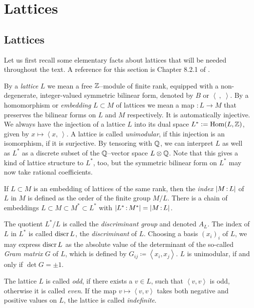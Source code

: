 \chapter{Lattices}
\section{Lattices}\label{latticeSubsection}
Let us first recall some elementary facts about lattices that will be needed throughout the text.
A reference for this section is Chapter 8.2.1 of \cite{Dolgachev}. 
\begin{definition}
By a \emph{lattice} $L$ we mean a free $\mathbb{Z}$--module of finite rank, equipped with a non-degenerate, integer-valued symmetric bilinear form, denoted by $B$ or $\left<\ ,\;\right>$. 
By a homomorphism or \emph{embedding} $L\subset M$ of lattices we mean a map $:L\rightarrow M$ that preserves the bilinear forms on $L$ and $M$ respectively. It is automatically injective. We always have the injection of a lattice $L$ into its dual space $L^*\vcentcolon= \operatorname{Hom}(L,\mathbb{Z})$, given by $x \mapsto \left<x,\ \right>$. A lattice is called \emph{unimodular}, if this injection is an isomorphism, \ie if it is surjective. By tensoring with $\mathbb{Q}$, we can interpret $L$ as well as $L^*$ as a discrete subset of the $\mathbb{Q}$--vector space $L\otimes \mathbb{Q}$. Note that this gives a kind of lattice structure to $L^*$, too, but the symmetric bilinear form on $L^*$ may now take rational coefficients.


If $L\subset M$ is an embedding of lattices of the same rank, then the \emph{index} $|M\,{:}\, L|$ of $L$ in $M$ is defined as the order of the finite group $M/L$.
There is a chain of embeddings $L\subset M \subset M^* \subset L^*$ with $|L^*\,{:}\, M^*| =|M\,{:}\, L| $.

The quotient $L^*/L$ is called the \emph{discriminant group} and denoted $A_L$. The index of $L$ in $L^*$ is called $\operatorname{discr} L$, the \emph{discriminant} of $L$.
Choosing a basis $(x_i)_i$ of $L$, we may express $\operatorname{discr} L$ as the absolute value of the determinant of the so-called \emph{Gram matrix} $G$ of $L$, which is defined by $G_{ij}\coloneqq \left<x_i,x_j\right>$. $L$ is unimodular, if and only if $\det G =\pm 1$.

The lattice $L$ is called \emph{odd}, if there exists a $v\in L$, such that $\left<v,v\right>$ is odd, otherwise it is called \emph{even}. 
If the map $v \mapsto \left<v,v\right>$ takes both negative and positive values on $L$, the lattice is called \emph{indefinite}. 
\end{definition}
